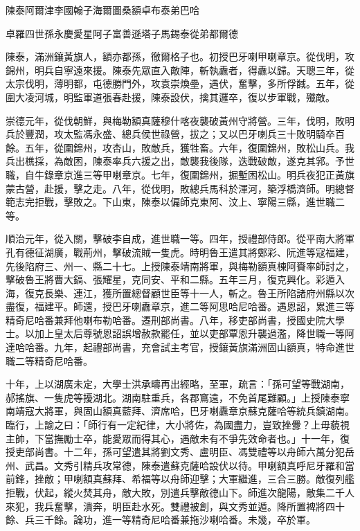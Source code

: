 
\begin{pinyinscope}
陳泰阿爾津李國翰子海爾圖桑額卓布泰弟巴哈

卓羅四世孫永慶愛星阿子富善遜塔子馬錫泰從弟都爾德

陳泰，滿洲鑲黃旗人，額亦都孫，徹爾格子也。初授巴牙喇甲喇章京。從伐明，攻錦州，明兵自寧遠來援。陳泰先眾直入敵陣，斬執纛者，得纛以歸。天聰三年，從太宗伐明，薄明都，屯德勝門外，攻袁崇煥壘，遇伏，奮擊，多所俘馘。五年，從圍大凌河城，明監軍道張春赴援，陳泰設伏，擒其邏卒，復以步軍戰，殲敵。

崇德元年，從伐朝鮮，與梅勒額真薩穆什喀夜襲破黃州守將營。三年，伐明，敗明兵於豐潤，攻太監馮永盛、總兵侯世祿營，拔之；又以巴牙喇兵三十敗明騎卒百餘。五年，從圍錦州，攻杏山，敗敵兵，獲牲畜。六年，復圍錦州，敗松山兵。我兵出樵採，為敵困，陳泰率兵六援之出，敵襲我後隊，迭戰破敵，遂克其郛。予世職，自牛錄章京進三等甲喇章京。七年，復圍錦州，掘塹困松山。明兵夜犯正黃旗蒙古營，赴援，擊之走。八年，從伐明，敗總兵馬科於渾河，築浮橋濟師。明總督範志完拒戰，擊敗之。下山東，陳泰以偏師克東阿、汶上、寧陽三縣，進世職二等。

順治元年，從入關，擊破李自成，進世職一等。四年，授禮部侍郎。從平南大將軍孔有德征湖廣，戰荊州，擊破流賊一隻虎。時明魯王遣其將鄭彩、阮進等寇福建，先後陷府三、州一、縣二十七。上授陳泰靖南將軍，與梅勒額真棟阿賚率師討之，擊破魯王將曹大鎬、張耀星，克同安、平和二縣。五年三月，復克興化。彩遁入海，復克長樂、連江，獲所置總督顧世臣等十一人，斬之。魯王所陷諸府州縣以次盡復，福建平。師還，授巴牙喇纛章京，進二等阿思哈尼哈番。遇恩詔，累進三等精奇尼哈番兼拜他喇布勒哈番。遷刑部尚書。八年，移吏部尚書，授國史院大學士。以加上皇太后尊號恩詔誤增赦款罷任，並以吏部覃恩升襲過濫，降世職一等阿達哈哈番。九年，起禮部尚書，充會試主考官，授鑲黃旗滿洲固山額真，特命進世職二等精奇尼哈番。

十年，上以湖廣未定，大學士洪承疇再出經略，至軍，疏言：「孫可望等戰湖南，郝搖旗、一隻虎等擾湖北。湖南駐重兵，各郡窵遠，不免首尾難顧。」上授陳泰寧南靖寇大將軍，與固山額真藍拜、濟席哈，巴牙喇纛章京蘇克薩哈等統兵鎮湖南。臨行，上諭之曰：「師行有一定紀律，大小將佐，為國盡力，豈致挫釁？上毋藐視主帥，下當撫勵士卒，能愛眾而得其心，遇敵未有不爭先效命者也。」十一年，復授吏部尚書。十二年，孫可望遣其將劉文秀、盧明臣、馮雙禮等以舟師六萬分犯岳州、武昌。文秀引精兵攻常德，陳泰遣蘇克薩哈設伏以待。甲喇額真呼尼牙羅和當前鋒，挫敵；甲喇額真蘇拜、希福等以舟師迎擊；大軍繼進，三合三勝。敵復列艦拒戰，伏起，縱火焚其舟，敵大敗，別遣兵擊敵德山下。師進次龍陽，敵集二千人來犯，我兵奮擊，潰奔，明臣赴水死。雙禮被創，與文秀並遁。降所置裨將四十餘、兵三千餘。論功，進一等精奇尼哈番兼拖沙喇哈番。未幾，卒於軍。


\end{pinyinscope}
